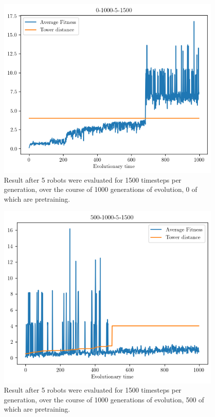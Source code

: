 \documentclass[12pt, a4paper]{article}
\begin{document}
\newpage
\begin{figure}[h]
	\centering
	\includegraphics[width=\textwidth]{0-1000-5-1500/0-1000-5-1500.png}
	\caption{Result after 5 robots were evaluated for 1500 timesteps per generation, over the course of 1000 generations of evolution, 0 of which are pretraining.}
	\label{0-1000-5}
\end{figure}

\begin{figure}[h]
	\centering
	\includegraphics[width=1\textwidth]{500-1000-5-1500/500-1000-5-1500.png}
	\caption{Result after 5 robots were evaluated for 1500 timesteps per generation, over the course of 1000 generations of evolution, 500 of which are pretraining.}
	\label{500-1000-5}
\end{figure}
\end{document}
